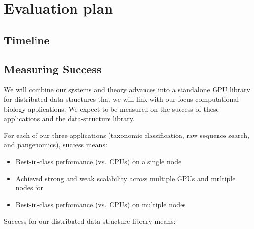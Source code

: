 \section{Evaluation plan}


\subsection{Timeline}

\subsection{Measuring Success} We will combine our systems and theory advances into a standalone GPU library for distributed data structures that we will link with our focus computational biology applications. We expect to be measured on the success of these applications and the data-structure library.

For each of our three applications (taxonomic classification, raw sequence search, and pangenomics), success means:

\begin{itemize}
  \item Best-in-class performance (vs.\ CPUs) on a single node
  \item Achieved strong and weak scalability across multiple GPUs and multiple nodes for
  \item Best-in-class performance (vs.\ CPUs) on multiple nodes
\end{itemize}

\noindent
Success for our distributed data-structure library means:

\label{sec:sw-methodology}

